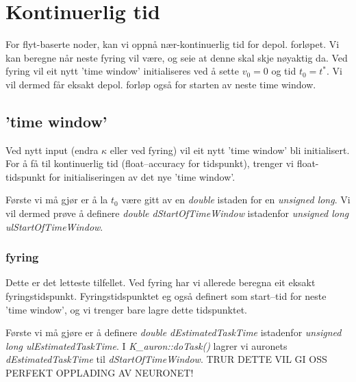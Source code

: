 
\section{Kontinuerlig tid}
\label{secKontinuerligTid}
For flyt-baserte noder, kan vi oppnå nær-kontinuerlig tid for depol. forløpet.
Vi kan beregne når neste fyring vil være, og seie at denne skal skje nøyaktig da. 
Ved fyring vil eit nytt 'time window' initialiseres ved å sette $v_0 = 0$ og tid $t_0=t^*$.
Vi vil dermed får eksakt depol. forløp også for starten av neste time window.

	\subsection{'time window'}
	Ved nytt input (endra $\kappa$ eller ved fyring) vil eit nytt 'time window' bli initialisert.
	For å få til kontinuerlig tid (float--accuracy for tidspunkt), trenger vi float-tidspunkt for initialiseringen av det nye 'time window'.

	Første vi må gjør er å la $t_0$ være gitt av en \emph{double} istaden for en \emph{unsigned long}.
	Vi vil dermed prøve å definere \emph{double dStartOfTimeWindow} istadenfor \emph{unsigned long ulStartOfTimeWindow}.
	
		\subsubsection{fyring}
		Dette er det letteste tilfellet. Ved fyring har vi allerede beregna eit eksakt fyringstidspunkt.
		Fyringstidspunktet eg også definert som start--tid for neste 'time window', og  vi trenger bare lagre dette tidspunktet.

		Første vi må gjøre er å definere \emph{double dEstimatedTaskTime} istadenfor \emph{unsigned long ulEstimatedTaskTime}.
		I \emph{K\_auron::doTask()} lagrer vi auronets \emph{dEstimatedTaskTime} til \emph{dStartOfTimeWindow}.
		TRUR DETTE VIL GI OSS PERFEKT OPPLADING AV NEURONET!
	
